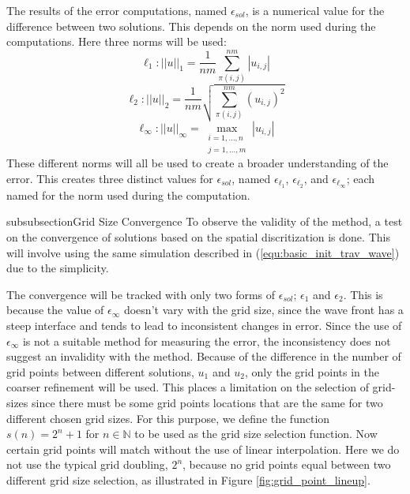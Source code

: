   The results of the error computations, named $\epsilon_{sol}$, is a numerical value for the difference between two solutions.
  This depends on the norm used during the computations.
  Here three norms will be used:
  \begin{equation}  \label{equ:norm_l1}
    \ell_1: ||u||_1 = \frac{1}{nm} \sum_{\pi(i,j)}^{nm} |u_{i,j}|
  \end{equation}
  \begin{equation}  \label{equ:norm_l2}
    \ell_2: ||u||_2 = \frac{1}{nm} \sqrt{\sum_{\pi(i,j)}^{nm} (u_{i,j})^2}
  \end{equation}
  \begin{equation}  \label{equ:norm_linf}
    \ell_\infty: ||u||_\infty = \max_{\substack{i=1,\ldots,n \\j=1,\ldots,m}} |u_{i,j}|
  \end{equation}
  These different norms will all be used to create a broader understanding of the error.
  This creates three distinct values for $\epsilon_{sol}$, named $\epsilon_{\ell_1}$, $\epsilon_{\ell_2}$, and $\epsilon_{\ell_\infty}$; each named for the norm used during the computation.
  

subsubsection{Grid Size Convergence}
  To observe the validity of the method, a test on the convergence of solutions based on the spatial discritization is done.
  This will involve using the same simulation described in (\ref{equ:basic_init_trav_wave}) due to the simplicity. 
 
  The convergence will be tracked with only two forms of $\epsilon_{sol}$; $\epsilon_1$ and $\epsilon_2$.
  This is because the value of $\epsilon_{\infty}$ doesn't vary with the grid size, since the wave front has a steep interface and tends to lead to inconsistent changes in error.
  Since the use of $\epsilon_{\infty}$ is not a suitable method for measuring the error, the inconsistency does not suggest an invalidity with the method.
  Because of the difference in the number of grid points between different solutions, $u_1$ and $u_2$, only the grid points in the coarser refinement will be used.
  This places a limitation on the selection of grid-sizes since there must be some grid points locations that are the same for two different chosen grid sizes.
  For this purpose, we define the function $s(n) = 2^{n}+1$ for $n \in \mathbb{N}$ to be used as the grid size selection function.
  Now certain grid points will match without the use of linear interpolation.
  Here we do not use the typical grid doubling, $2^n$, because no grid points equal between two different grid size selection, as illustrated in Figure \ref{fig:grid_point_lineup}.

